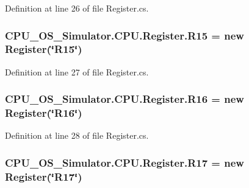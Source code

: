Definition at line 26 of file Register.\+cs.

\hypertarget{class_c_p_u___o_s___simulator_1_1_c_p_u_1_1_register_a643aa109f6aea2e44a92aca9cd62b2df}{}
\subsubsection[{R15}]{ C\+P\+U\+\_\+\+O\+S\+\_\+\+Simulator.\+C\+P\+U.\+Register.\+R15 = new {\bf Register}(\char`\"{}R15\char`\"{})\hspace{0.3cm}{\ttfamily [static]}}\label{class_c_p_u___o_s___simulator_1_1_c_p_u_1_1_register_a643aa109f6aea2e44a92aca9cd62b2df}


Definition at line 27 of file Register.\+cs.

\hypertarget{class_c_p_u___o_s___simulator_1_1_c_p_u_1_1_register_ac008605898ab29a4ecd071f25f9e2d50}{}
\subsubsection[{R16}]{ C\+P\+U\+\_\+\+O\+S\+\_\+\+Simulator.\+C\+P\+U.\+Register.\+R16 = new {\bf Register}(\char`\"{}R16\char`\"{})\hspace{0.3cm}{\ttfamily [static]}}\label{class_c_p_u___o_s___simulator_1_1_c_p_u_1_1_register_ac008605898ab29a4ecd071f25f9e2d50}


Definition at line 28 of file Register.\+cs.

\hypertarget{class_c_p_u___o_s___simulator_1_1_c_p_u_1_1_register_add014a0021f9e8115728d7b95a398bda}{}
\subsubsection[{R17}]{ C\+P\+U\+\_\+\+O\+S\+\_\+\+Simulator.\+C\+P\+U.\+Register.\+R17 = new {\bf Register}(\char`\"{}R17\char`\"{})\hspace{0.3cm}{\ttfamily [static]}}\label{class_c_p_u___o_s___simulator_1_1_c_p_u_1_1_register_add014a0021f9e8115728d7b95a398bda}


